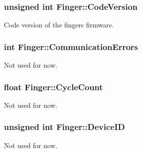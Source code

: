 \subsubsection[{\texorpdfstring{Code\+Version}{CodeVersion}}]{\setlength{\rightskip}{0pt plus 5cm}unsigned int Finger\+::\+Code\+Version}\hypertarget{struct_finger_a39f1fa57fc87fe6bcb09bc43d16a6389}{}\label{struct_finger_a39f1fa57fc87fe6bcb09bc43d16a6389}


Code version of the finger\textquotesingle{}s firmware. 

\subsubsection[{\texorpdfstring{Communication\+Errors}{CommunicationErrors}}]{\setlength{\rightskip}{0pt plus 5cm}int Finger\+::\+Communication\+Errors}\hypertarget{struct_finger_a688ac73326f0d7e071bb3755ff3f6a02}{}\label{struct_finger_a688ac73326f0d7e071bb3755ff3f6a02}


Not used for now. 

\subsubsection[{\texorpdfstring{Cycle\+Count}{CycleCount}}]{\setlength{\rightskip}{0pt plus 5cm}float Finger\+::\+Cycle\+Count}\hypertarget{struct_finger_a52eadd12c593a5fd5cc554a11619bc5d}{}\label{struct_finger_a52eadd12c593a5fd5cc554a11619bc5d}


Not used for now. 

\subsubsection[{\texorpdfstring{Device\+ID}{DeviceID}}]{\setlength{\rightskip}{0pt plus 5cm}unsigned int Finger\+::\+Device\+ID}\hypertarget{struct_finger_a933827723641f328b9d640ed9fa579fe}{}\label{struct_finger_a933827723641f328b9d640ed9fa579fe}


Not used for now. 

